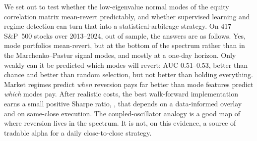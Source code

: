 We set out to test whether the low-eigenvalue normal modes of the
equity correlation matrix mean-revert predictably, and whether
supervised learning and regime detection can turn that into a
statistical-arbitrage strategy. On 417 S\&P~500 stocks over 2013--2024,
out of sample, the answers are as follows. Yes, mode portfolios
mean-revert, but at the bottom of the spectrum rather than in the
Marchenko--Pastur signal modes, and mostly at a one-day horizon. Only
weakly can it be predicted which modes will revert: AUC 0.51--0.53,
better than chance and better than random selection, but not better
than holding everything. Market regimes predict \emph{when} reversion
pays far better than mode features predict \emph{which} modes pay.
After realistic costs, the best walk-forward implementation earns a
small positive Sharpe ratio, \SRMLOverB{}, that depends on a
data-informed overlay and on same-close execution. The
coupled-oscillator analogy is a good map of where reversion lives in
the spectrum. It is not, on this evidence, a source of tradable alpha
for a daily close-to-close strategy.
